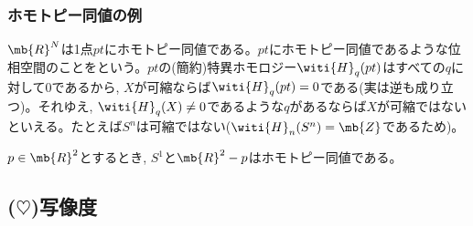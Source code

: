 \subsubsection{ホモトピー同値の例}
\begin{eg}
$\mb{R}^{N}$は1点$pt$にホモトピー同値である。$pt$にホモトピー同値であるような位相空間のことをという。$pt$の(簡約)特異ホモロジー$\witi{H}_{q}(pt)$はすべての$q$に対して$0$であるから, $X$が可縮ならば$\witi{H}_{q}(pt) = 0$である(実は逆も成り立つ)。それゆえ, $\witi{H}_{q}(X)\neq 0$であるような$q$があるならば$X$が可縮ではないといえる。たとえば$S^n$は可縮ではない($\witi{H}_{n}(S^n) = \mb{Z}$であるため)。
\end{eg}
\begin{eg}
$p\in \mb{R}^2$とするとき, $S^{1}$と$\mb{R}^{2} - p$はホモトピー同値である。
\end{eg}



\subsection{($\heartsuit$)写像度} %
